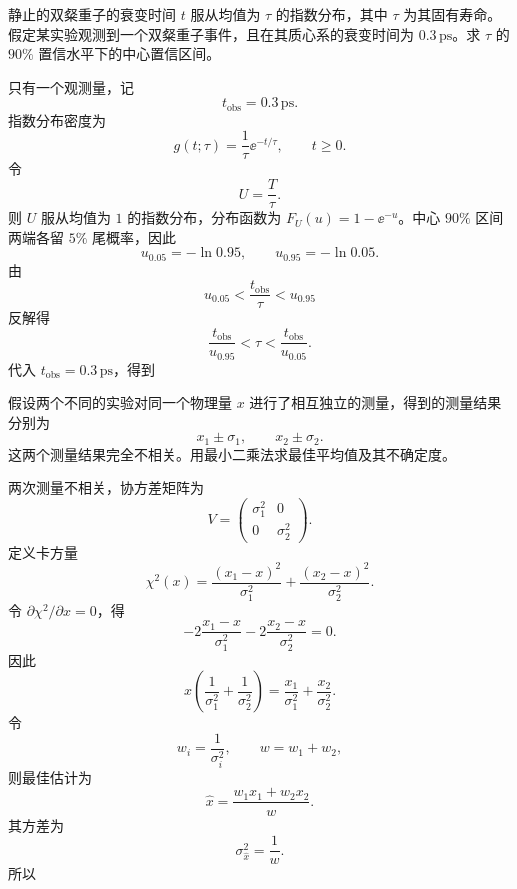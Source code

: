 \begin{question}
静止的双粲重子的衰变时间 $t$ 服从均值为 $\tau$ 的指数分布，其中 $\tau$ 为其固有寿命。假定某实验观测到一个双粲重子事件，且在其质心系的衰变时间为 $0.3\,\mathrm{ps}$。求 $\tau$ 的 $90\%$ 置信水平下的中心置信区间。
\begin{solution}
只有一个观测量，记
\[
t_{\mathrm{obs}}=0.3\,\mathrm{ps}.
\]
指数分布密度为
\[
g(t;\tau)=\frac1\tau \ee^{-t/\tau},\qquad t\ge0.
\]
令
\[
U=\frac{T}{\tau}.
\]
则 $U$ 服从均值为 $1$ 的指数分布，分布函数为 $F_U(u)=1-\ee^{-u}$。中心 $90\%$ 区间两端各留 $5\%$ 尾概率，因此
\[
u_{0.05}=-\ln0.95,
\qquad
u_{0.95}=-\ln0.05.
\]
由
\[
u_{0.05}<\frac{t_{\mathrm{obs}}}{\tau}<u_{0.95}
\]
反解得
\[
\frac{t_{\mathrm{obs}}}{u_{0.95}}<\tau<\frac{t_{\mathrm{obs}}}{u_{0.05}}.
\]
代入 $t_{\mathrm{obs}}=0.3\,\mathrm{ps}$，得到
\end{solution}
\end{question}

\begin{question}
假设两个不同的实验对同一个物理量 $x$ 进行了相互独立的测量，得到的测量结果分别为
\[
x_1\pm\sigma_1,
\qquad
x_2\pm\sigma_2.
\]
这两个测量结果完全不相关。用最小二乘法求最佳平均值及其不确定度。
\begin{solution}
两次测量不相关，协方差矩阵为
\[
V=\begin{pmatrix}
\sigma_1^2&0\\
0&\sigma_2^2
\end{pmatrix}.
\]
定义卡方量
\[
\chi^2(x)=\frac{(x_1-x)^2}{\sigma_1^2}
+\frac{(x_2-x)^2}{\sigma_2^2}.
\]
令 $\partial\chi^2/\partial x=0$，得
\[
-2\frac{x_1-x}{\sigma_1^2}
-2\frac{x_2-x}{\sigma_2^2}=0.
\]
因此
\[
x\left(\frac1{\sigma_1^2}+\frac1{\sigma_2^2}\right)
=\frac{x_1}{\sigma_1^2}+\frac{x_2}{\sigma_2^2}.
\]
令
\[
w_i=\frac1{\sigma_i^2},\qquad w=w_1+w_2,
\]
则最佳估计为
\[
\hat x=\frac{w_1x_1+w_2x_2}{w}.
\]
其方差为
\[
\sigma_{\hat x}^2=\frac1w.
\]
所以
\end{solution}
\end{question}

